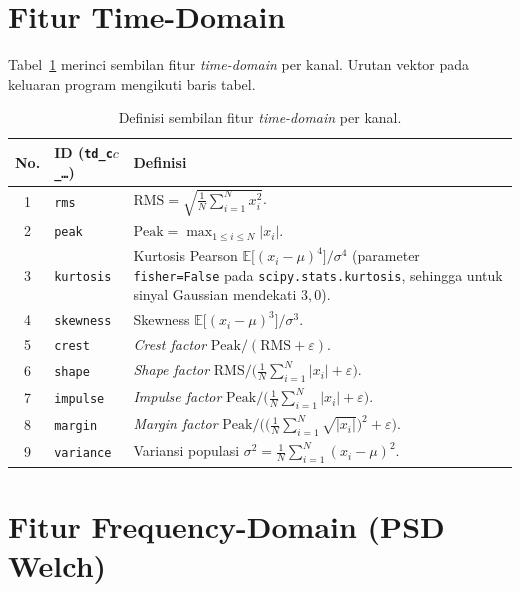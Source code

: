 \section{Fitur Time-Domain}
\label{lamp:fitur_time}

Tabel~\ref{tab:lampA_time} merinci sembilan fitur \emph{time-domain}
per kanal. Urutan vektor pada keluaran program mengikuti baris tabel.

\begin{table}[ht]
  \centering
  \caption{Definisi sembilan fitur \emph{time-domain} per kanal.}
  \label{tab:lampA_time}
  \footnotesize
  \begin{tabularx}{\textwidth}{@{}c l X@{}}
    \toprule
    \textbf{No.} & \textbf{ID (\texttt{td\_c$c$\_\dots})} & \textbf{Definisi} \\
    \midrule
    1 & \texttt{rms} &
    $\mathrm{RMS} = \sqrt{\frac{1}{N}\sum_{i=1}^{N} x_i^2}$. \\
    2 & \texttt{peak} &
    $\mathrm{Peak} = \max_{1 \le i \le N} |x_i|$. \\
    3 & \texttt{kurtosis} &
    Kurtosis Pearson
    $\mathbb{E}\bigl[(x_i-\mu)^4\bigr]/\sigma^4$
    (parameter \texttt{fisher=False} pada \texttt{scipy.stats.kurtosis},
    sehingga untuk sinyal Gaussian mendekati $3{,}0$). \\
    4 & \texttt{skewness} &
    Skewness
    $\mathbb{E}\bigl[(x_i-\mu)^3\bigr]/\sigma^3$. \\
    5 & \texttt{crest} &
    \emph{Crest factor} $\mathrm{Peak}/(\mathrm{RMS}+\varepsilon)$. \\
    6 & \texttt{shape} &
    \emph{Shape factor}
    $\mathrm{RMS}/\bigl(\frac{1}{N}\sum_{i=1}^{N}|x_i| + \varepsilon\bigr)$. \\
    7 & \texttt{impulse} &
    \emph{Impulse factor}
    $\mathrm{Peak}/\bigl(\frac{1}{N}\sum_{i=1}^{N}|x_i| + \varepsilon\bigr)$. \\
    8 & \texttt{margin} &
    \emph{Margin factor}
    $\mathrm{Peak}/\bigl(\bigl(\frac{1}{N}\sum_{i=1}^{N}\sqrt{|x_i|}\bigr)^2 + \varepsilon\bigr)$. \\
    9 & \texttt{variance} &
    Variansi populasi
    $\sigma^2 = \frac{1}{N}\sum_{i=1}^{N}(x_i-\mu)^2$. \\
    \bottomrule
  \end{tabularx}
\end{table}

\section{Fitur Frequency-Domain (PSD Welch)}
\label{lamp:fitur_freq}

